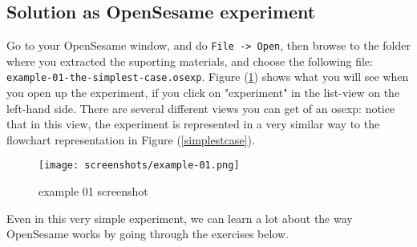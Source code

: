 \documentclass[a4paper]{tufte-handout}
\begin{document}
\subsection{Solution as OpenSesame experiment}
Go to your OpenSesame window, and do \texttt{File -> Open}, then browse to the folder where you extracted the suporting materials, and choose the following file: \texttt{example-01-the-simplest-case.osexp}. Figure (\ref{example-01-png}) shows what you will see when you open up the experiment, if you click on "experiment" in the list-view on the left-hand side. There are several different views you can get of an osexp: notice that in this view, the experiment is represented in a very similar way to the flowchart representation in Figure (\ref{simplestcase}).

\begin{figure}[hbtp]
\texttt{[image: screenshots/example-01.png]}
\caption{example 01 screenshot}
\label{example-01-png}
\end{figure}

Even in this very simple experiment, we can learn a lot about the way OpenSesame works by going through the exercises below.
\end{document}
